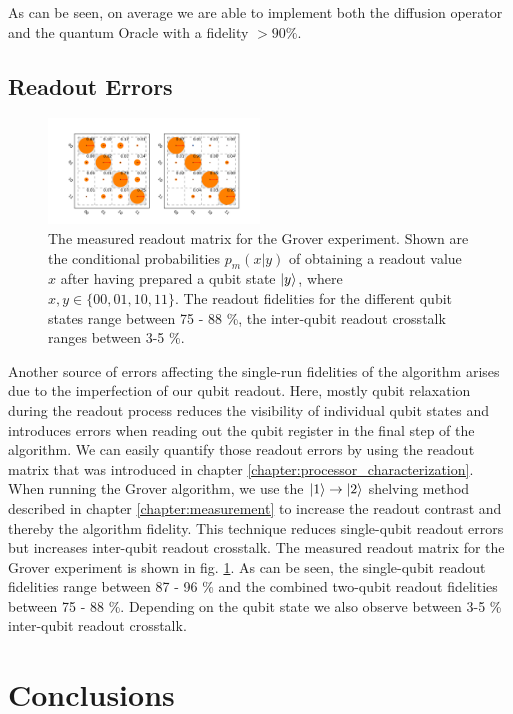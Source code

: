 As can be seen, on average we are able to implement both the diffusion operator and the quantum Oracle with a fidelity $>90\%$.
\subsection{Readout Errors}

\begin{figure}
	\centering
\includegraphics[width=0.5\textwidth]{"./data/ct5/2011_04_21 - grover and tomo/good_data/readout only"}
	\caption{The measured readout matrix for the Grover experiment. Shown are the conditional probabilities $p_m(x|y)$ of obtaining a readout value $x$ after having prepared a qubit state $\left| y \right>$, where $x,y\in\{00,01,10,11\}$. The readout fidelities for the different qubit states range between 75 - 88 \%, the inter-qubit readout crosstalk ranges between 3-5 \%.}
	\label{fig:GroverReadoutMatrix}
\end{figure}

Another source of errors affecting the single-run fidelities of the algorithm arises due to the imperfection of our qubit readout. Here, mostly qubit relaxation during the readout process reduces the visibility of individual qubit states and introduces errors when reading out the qubit register in the final step of the algorithm. We can easily quantify those readout errors by using the readout matrix that was introduced in chapter \ref{chapter:processor_characterization}. When running the Grover algorithm, we use the $\left| 1 \right>\to\left| 2 \right>$ shelving method described in chapter \ref{chapter:measurement} to increase the readout contrast and thereby the algorithm fidelity. This technique reduces single-qubit readout errors but increases inter-qubit readout crosstalk. The measured readout matrix for the Grover experiment is shown in fig. \ref{fig:GroverReadoutMatrix}. As can be seen, the single-qubit readout fidelities range between 87 - 96 \% and the combined two-qubit readout fidelities between 75 - 88 \%. Depending on the qubit state we also observe between 3-5 \% inter-qubit readout crosstalk.

\section{Conclusions}

